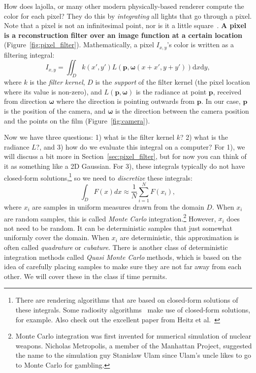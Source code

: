 How does lajolla, or many other modern physically-based renderer compute the color for each pixel? They do this by \emph{integrating} all lights that go through a pixel. Note that a pixel is not an infinitesimal point, nor is it a little square~\cite{Smith:1995:PLS}. \textbf{A pixel is a reconstruction filter over an image function at a certain location} (Figure~\ref{fig:pixel_filter}). Mathematically, a pixel $I_{x, y}$'s color is written as a filtering integral:
\begin{equation}
    I_{x, y} = \iint_{D} k(x', y') L(\mathbf{p}, \mathbf{\omega}(x + x', y + y')) \mathrm{d}x\mathrm{d}y,
    \label{eq:pixel_filter}
\end{equation}
where $k$ is the \emph{filter kernel}, $D$ is the \emph{support} of the filter kernel (the pixel location where its value is non-zero), and $L(\mathbf{p}, \mathbf{\omega})$ is the radiance at point $\mathbf{p}$, received from direction $\mathbf{\omega}$ where the direction is pointing outwards from $\mathbf{p}$. In our case, $\mathbf{p}$ is the position of the camera, and $\mathbf{\omega}$ is the direction between the camera position and the points on the film (Figure~\ref{fig:camera}).

Now we have three questions: 1) what is the filter kernel $k$? 2) what is the radiance $L$?, and 3) how do we evaluate this integral on a computer? For 1), we will discuss a bit more in Section~\ref{sec:pixel_filter}, but for now you can think of it as something like a 2D Gaussian. For 3), these integrals typically do not have closed-form solutions,\footnote{There are rendering algorithms that are based on closed-form solutions of these integrals. Some radiosity algorithms~\cite{Schroder:1993:OFF} make use of closed-form solutions, for example. Also check out the excellent paper from Heitz et al.~\cite{Heitz:2016:RPS}} so we need to \emph{discretize} these integrals:
\begin{equation}
    \int_{D} F(x) dx \approx \frac{1}{N} \sum_{i=1}^{N} F(x_i),
    \label{eq:discretization}
\end{equation}
where $x_i$ are samples in uniform measures drawn from the domain $D$. When $x_i$ are random samples, this is called \emph{Monte Carlo} integration.\footnote{Monte Carlo integration was first invented for numerical simulation of nuclear weapons. Nicholas Metropolis, a member of the Manhattan Project, suggested the name to the simulation guy Stanislaw Ulam since Ulam's uncle likes to go to Monte Carlo for gambling.} However, $x_i$ does not need to be random. It can be deterministic samples that just somewhat uniformly cover the domain. When $x_i$ are deterministic, this approximation is often called \emph{quadrature} or \emph{cubature}. There is another class of deterministic integration methods called \emph{Quasi Monte Carlo} methods, which is based on the idea of carefully placing samples to make sure they are not far away from each other. We will cover these in the class if time permits.

